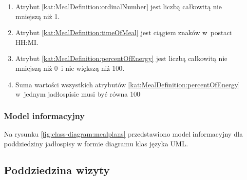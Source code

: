\begin{itemize}[label={\textbf{Ograniczenia dla}}, wide, labelwidth=!, labelindent=0pt]
\begin{enumerate}[label={\textbf{OGR/4/\protect\twodigits{\arabic{enumi}}}}, wide, labelwidth=!, align=left, leftmargin=3cm, resume]
        \item Atrybut \ref{kat:MealDefinition:ordinalNumber} jest liczbą całkowitą nie mniejszą niż 1.
        \item Atrybut \ref{kat:MealDefinition:timeOfMeal} jest ciągiem znaków w~postaci HH:MI.
        \item Atrybut \ref{kat:MealDefinition:percentOfEnergy} jest liczbą całkowitą nie mniejszą niż 0~i nie większą niż 100.
        \item Suma wartości wszystkich atrybutów \ref{kat:MealDefinition:percentOfEnergy} w~jednym jadłospisie musi być równa 100
    \end{enumerate}
\end{itemize}

\subsubsection{Model informacyjny}\label{subsubsec:database:mealplans:domainModel}

Na rysunku \ref{fig:class-diagram:mealplans} przedstawiono model informacyjny dla poddziedziny jadłospisy w formie diagramu klas języka UML.


\subsection{Poddziedzina wizyty}\label{subsec:database:appointments}

